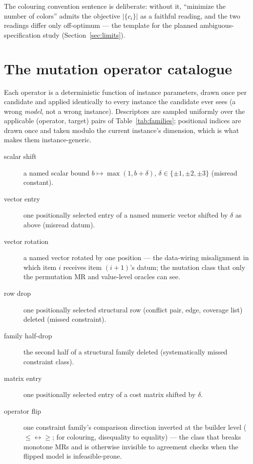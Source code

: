 \documentclass[pdflatex,sn-mathphys-num]{sn-jnl}
\theoremstyle{thmstyleone}
\theoremstyle{thmstyletwo}
\begin{document}
\begin{appendices}
The colouring convention sentence is deliberate: without it,
``minimize the number of colors'' admits the objective
$|\{c_i\}|$ as a faithful reading, and the two readings differ only
off-optimum --- the template for the planned ambiguous-specification
study (Section~\ref{sec:limits}).

\section{The mutation operator catalogue}\label{app:mutations}

Each operator is a deterministic function of instance parameters,
drawn once per candidate and applied identically to every instance
the candidate ever sees (a wrong \emph{model}, not a wrong instance).
Descriptors are sampled uniformly over the applicable
(operator, target) pairs of Table~\ref{tab:families}; positional
indices are drawn once and taken modulo the current instance's
dimension, which is what makes them instance-generic.

\begin{description}
\item[scalar shift] a named scalar bound $b \mapsto \max(1, b+\delta)$,
  $\delta \in \{\pm 1, \pm 2, \pm 3\}$ (misread constant).
\item[vector entry] one positionally selected entry of a named
  numeric vector shifted by $\delta$ as above (misread datum).
\item[vector rotation] a named vector rotated by one position ---
  the data-wiring misalignment in which item $i$ receives item
  $(i{+}1)$'s datum; the mutation class that only the permutation MR
  and value-level oracles can see.
\item[row drop] one positionally selected structural row (conflict
  pair, edge, coverage list) deleted (missed constraint).
\item[family half-drop] the second half of a structural family
  deleted (systematically missed constraint class).
\item[matrix entry] one positionally selected entry of a cost matrix
  shifted by $\delta$.
\item[operator flip] one constraint family's comparison direction
  inverted at the builder level ($\le \leftrightarrow \ge$; for
  colouring, disequality to equality) --- the class that breaks
  monotone MRs and is otherwise invisible to agreement checks when
  the flipped model is infeasible-prone.
\end{description}


\end{appendices}
\end{document}
